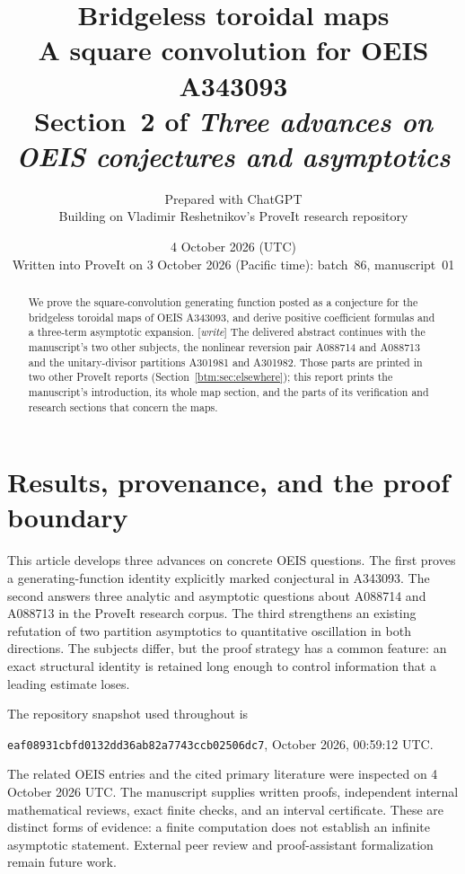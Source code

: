 \documentclass[11pt,letterpaper]{article}
\title{\textbf{Bridgeless toroidal maps}\\[7pt]
 \large A square convolution for OEIS A343093\\[5pt]
 \normalsize Section~2 of \emph{Three advances on OEIS conjectures and asymptotics}}
\author{Prepared with ChatGPT\\[2pt]
 \small Building on Vladimir Reshetnikov's ProveIt research repository}
\date{4 October 2026 (UTC)\\[2pt]
 \small Written into ProveIt on 3 October 2026 (Pacific time): batch~86, manuscript~01}
\numberwithin{equation}{section}
\theoremstyle{definition}
\theoremstyle{remark}
\begin{document}
\hypersetup{pageanchor=false}
\maketitle
\hypersetup{pageanchor=true}
\begin{abstract}
We prove the square-convolution generating function posted as a conjecture
for the bridgeless toroidal maps of OEIS A343093, and derive positive
coefficient formulas and a three-term asymptotic expansion.
[\emph{write}] The delivered abstract continues with the manuscript's two
other subjects, the nonlinear reversion pair A088714 and A088713 and the
unitary-divisor partitions A301981 and A301982. Those parts are printed in
two other ProveIt reports (Section~\ref{btm:sec:elsewhere}); this report
prints the manuscript's introduction, its whole map section, and the parts of
its verification and research sections that concern the maps.
\end{abstract}
\clearpage
\tableofcontents
\clearpage

\section{Results, provenance, and the proof boundary}
\label{btm:intro:results}

This article develops three advances on concrete OEIS questions. The first
proves a generating-function identity explicitly marked conjectural in
A343093. The second answers three analytic and asymptotic questions about
A088714 and A088713 in the ProveIt research corpus. The third strengthens
an existing refutation of two partition asymptotics to quantitative
oscillation in both directions. The subjects differ, but the proof strategy
has a common feature: an exact structural identity is retained long enough
to control information that a leading estimate loses.

The repository snapshot used throughout is
\begin{center}\small
 \texttt{eaf08931cbfd0132dd36ab82a7743ccb02506dc7},
  October 2026, 00:59:12 UTC.
\end{center}
The related OEIS entries and the cited primary literature were inspected
on 4 October 2026 UTC. The manuscript supplies written proofs, independent
internal mathematical reviews, exact finite checks, and an interval
certificate. These are distinct forms of evidence: a finite computation
does not establish an infinite asymptotic statement. External peer review
and proof-assistant formalization remain future work.
\end{document}
